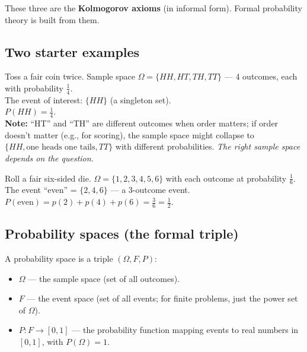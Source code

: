 \documentclass[11pt, a4paper]{article}
\begin{document}
These three are the \textbf{Kolmogorov axioms} (in informal form). Formal probability theory is built from them.

\subsection{Two starter examples}

\begin{exbox}
Toss a fair coin twice. Sample space $\Omega = \{HH, HT, TH, TT\}$ — 4 outcomes, each with probability $\frac{1}{4}$.\\[0.3em]
The event of interest: $\{HH\}$ (a singleton set).\\[0.3em]
$P(HH) = \frac{1}{4}$.\\[0.3em]
\textbf{Note:} ``HT'' and ``TH'' are different outcomes when order matters; if order doesn't matter (e.g., for scoring), the sample space might collapse to $\{HH, \text{one heads one tails}, TT\}$ with different probabilities. \emph{The right sample space depends on the question.}
\end{exbox}

\begin{exbox}
Roll a fair six-sided die. $\Omega = \{1, 2, 3, 4, 5, 6\}$ with each outcome at probability $\frac{1}{6}$.\\[0.3em]
The event ``even'' = $\{2, 4, 6\}$ — a 3-outcome event.\\[0.3em]
$P(\text{even}) = p(2) + p(4) + p(6) = \frac{3}{6} = \frac{1}{2}$.
\end{exbox}

\subsection{Probability spaces (the formal triple)}

\begin{defbox}
A probability space is a triple $(\Omega, F, P)$:
\begin{itemize}[itemsep=0pt, topsep=0pt]
  \item $\Omega$ — the sample space (set of all outcomes).
  \item $F$ — the event space (set of all events; for finite problems, just the power set of $\Omega$).
  \item $P : F \to [0, 1]$ — the probability function mapping events to real numbers in $[0, 1]$, with $P(\Omega) = 1$.
\end{itemize}
\end{defbox}
\end{document}
